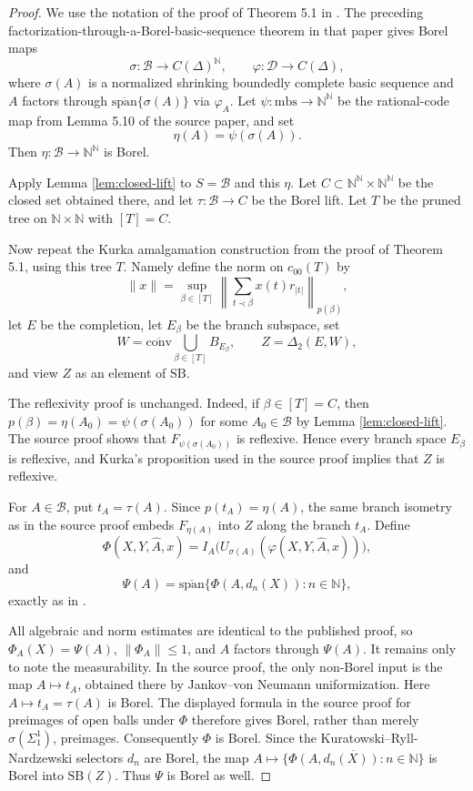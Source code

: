 \documentclass[11pt]{article}
\newcommand{\N}{\mathbb{N}}
\newcommand{\SB}{\mathrm{SB}}
\newcommand{\cB}{\mathcal{B}}
\newcommand{\cD}{\mathcal{D}}
\begin{document}
\begin{proof}
We use the notation of the proof of Theorem 5.1 in
\cite{AntunesBeanlandBraga}. The preceding factorization-through-a-Borel-basic-sequence
theorem in that paper gives
Borel maps
\[
   \sigma:\cB\to C(\Delta)^\N,\qquad
   \varphi:\cD\to C(\Delta),
\]
where $\sigma(A)$ is a normalized shrinking boundedly complete basic sequence
and $A$ factors through $\overline{\mathrm{span}}\{\sigma(A)\}$ via
$\varphi_A$. Let $\psi:\mathrm{mbs}\to\N^\N$ be the rational-code map from
Lemma 5.10 of the source paper, and set
\[
   \eta(A)=\psi(\sigma(A)).
\]
Then $\eta:\cB\to\N^\N$ is Borel.

Apply Lemma \ref{lem:closed-lift} to $S=\cB$ and this $\eta$. Let
$C\subset\N^\N\times\N^\N$ be the closed set obtained there, and let
$\tau:\cB\to C$ be the Borel lift. Let $T$ be the pruned tree on
$\N\times\N$ with $[T]=C$.

Now repeat the Kurka amalgamation construction from the proof of Theorem 5.1,
using this tree $T$. Namely define the norm on $c_{00}(T)$ by
\[
   \|x\|
   =
   \sup_{\beta\in [T]}
   \left\|
       \sum_{t\prec\beta} x(t) r_{|t|}
   \right\|_{p(\beta)},
\]
let $E$ be the completion, let $E_\beta$ be the branch subspace, set
\[
   W=\overline{\mathrm{conv}}\bigcup_{\beta\in[T]} B_{E_\beta},
   \qquad
   Z=\Delta_2(E,W),
\]
and view $Z$ as an element of $\SB$.

The reflexivity proof is unchanged. Indeed, if $\beta\in[T]=C$, then
$p(\beta)=\eta(A_0)=\psi(\sigma(A_0))$ for some $A_0\in\cB$ by
Lemma \ref{lem:closed-lift}. The source proof shows that
$F_{\psi(\sigma(A_0))}$ is reflexive. Hence every branch space $E_\beta$ is
reflexive, and Kurka's proposition used in the source proof implies that
$Z$ is reflexive.

For $A\in\cB$, put $t_A=\tau(A)$. Since $p(t_A)=\eta(A)$, the same branch
isometry as in the source proof embeds $F_{\eta(A)}$ into $Z$ along the branch
$t_A$. Define
\[
   \Phi(X,Y,\widehat A,x)
      =
      I_A\bigl(U_{\sigma(A)}(\varphi(X,Y,\widehat A,x))\bigr),
\]
and
\[
   \Psi(A)
      =
      \overline{\mathrm{span}}\{\Phi(A,d_n(X)):n\in\N\},
\]
exactly as in \cite{AntunesBeanlandBraga}.

All algebraic and norm estimates are identical to the published proof, so
$\Phi_A(X)=\Psi(A)$, $\|\Phi_A\|\le 1$, and $A$ factors through $\Psi(A)$.
It remains only to note the measurability. In the source proof, the only
non-Borel input is the map $A\mapsto t_A$, obtained there by
Jankov--von Neumann uniformization. Here $A\mapsto t_A=\tau(A)$ is Borel.
The displayed formula in the source proof for preimages of open balls under
$\Phi$ therefore gives Borel, rather than merely
$\sigma(\Sigma^1_1)$, preimages. Consequently $\Phi$ is Borel. Since the
Kuratowski--Ryll-Nardzewski selectors $d_n$ are Borel, the map
$A\mapsto \overline{\{\Phi(A,d_n(X)):n\in\N\}}$ is Borel into $\SB(Z)$.
Thus $\Psi$ is Borel as well.
\end{proof}
\end{document}
